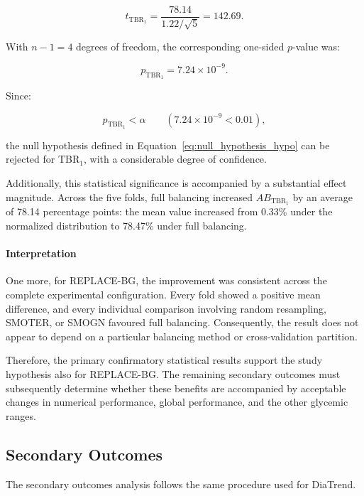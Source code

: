 \begin{equation}
t_{\mathrm{TBR_1}}
=
\frac{78.14}{1.22/\sqrt{5}}
=
142.69.
\end{equation}

With $n-1=4$ degrees of freedom, the corresponding one-sided $p$-value was:

\begin{equation}
p_{\mathrm{TBR_1}}
=
7.24 \times 10^{-9}.
\end{equation}

Since:

\begin{equation}
p_{\mathrm{TBR_1}} < \alpha
\qquad
(7.24 \times 10^{-9} < 0.01),
\end{equation}

the null hypothesis defined in Equation~\ref{eq:null_hypothesis_hypo} can be rejected for TBR$_1$, with a considerable degree of confidence.

Additionally, this statistical significance is accompanied by a substantial effect magnitude. Across the five folds, full balancing increased $AB_{\mathrm{TBR_1}}$ by an average of 78.14 percentage points: the mean value increased from 0.33\% under the normalized distribution to 78.47\% under full balancing.

\paragraph{Interpretation}

One more, for REPLACE-BG, the improvement was consistent across the complete experimental configuration. Every fold showed a positive mean difference, and every individual comparison involving random resampling, SMOTER, or SMOGN favoured full balancing. Consequently, the result does not appear to depend on a particular balancing method or cross-validation partition.

Therefore, the primary confirmatory statistical results support the study hypothesis also for REPLACE-BG. The remaining secondary outcomes must subsequently determine whether these benefits are accompanied by acceptable changes in numerical performance, global performance, and the other glycemic ranges.

\subsection{Secondary Outcomes}
\label{subsec:replacebg_secondary_outcomes}

The secondary outcomes analysis follows the same procedure used for DiaTrend.


